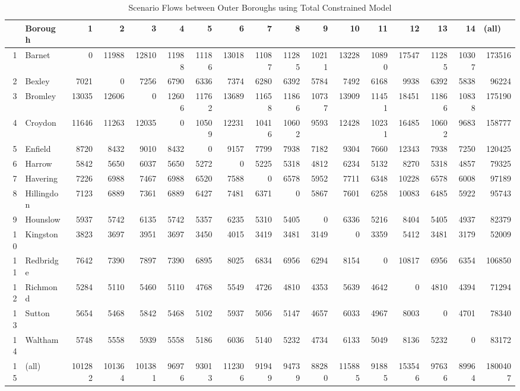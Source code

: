 \documentclass[11pt]{article} %
\begin{document}

\begin{table}
\footnotesize
\caption{Scenario Flows between Outer Boroughs using Total Constrained Model}
\begin{tabular}{|r|l|r|r|r|r|r|r|r|r|r|r|r|r|r|r|r|}
\hline
\multicolumn{1}{|l|}{} & Borough & 1 & 2 & 3 & 4 & 5 & 6 & 7 & 8 & 9 & 10 & 11 & 12 & 13 & 14 & \multicolumn{1}{l|}{(all)} \\ \hline
1 & Barnet & 0 & 11988 & 12810 & 11988 & 11186 & 13018 & 11087 & 11285 & 10211 & 13228 & 10890 & 17547 & 11285 & 10307 & 173516 \\ \hline
2 & Bexley & 7021 & 0 & 7256 & 6790 & 6336 & 7374 & 6280 & 6392 & 5784 & 7492 & 6168 & 9938 & 6392 & 5838 & 96224 \\ \hline
3 & Bromley & 13035 & 12606 & 0 & 12606 & 11762 & 13689 & 11658 & 11866 & 10737 & 13909 & 11451 & 18451 & 11866 & 10838 & 175190 \\ \hline
4 & Croydon & 11646 & 11263 & 12035 & 0 & 10509 & 12231 & 10416 & 10602 & 9593 & 12428 & 10231 & 16485 & 10602 & 9683 & 158777 \\ \hline
5 & Enfield & 8720 & 8432 & 9010 & 8432 & 0 & 9157 & 7799 & 7938 & 7182 & 9304 & 7660 & 12343 & 7938 & 7250 & 120425 \\ \hline
6 & Harrow & 5842 & 5650 & 6037 & 5650 & 5272 & 0 & 5225 & 5318 & 4812 & 6234 & 5132 & 8270 & 5318 & 4857 & 79325 \\ \hline
7 & Havering & 7226 & 6988 & 7467 & 6988 & 6520 & 7588 & 0 & 6578 & 5952 & 7711 & 6348 & 10228 & 6578 & 6008 & 97189 \\ \hline
8 & Hillingdon & 7123 & 6889 & 7361 & 6889 & 6427 & 7481 & 6371 & 0 & 5867 & 7601 & 6258 & 10083 & 6485 & 5922 & 95743 \\ \hline
9 & Hounslow & 5937 & 5742 & 6135 & 5742 & 5357 & 6235 & 5310 & 5405 & 0 & 6336 & 5216 & 8404 & 5405 & 4937 & 82379 \\ \hline
10 & Kingston & 3823 & 3697 & 3951 & 3697 & 3450 & 4015 & 3419 & 3481 & 3149 & 0 & 3359 & 5412 & 3481 & 3179 & 52009 \\ \hline
11 & Redbridge & 7642 & 7390 & 7897 & 7390 & 6895 & 8025 & 6834 & 6956 & 6294 & 8154 & 0 & 10817 & 6956 & 6354 & 106850 \\ \hline
12 & Richmond & 5284 & 5110 & 5460 & 5110 & 4768 & 5549 & 4726 & 4810 & 4353 & 5639 & 4642 & 0 & 4810 & 4394 & 71294 \\ \hline
13 & Sutton & 5654 & 5468 & 5842 & 5468 & 5102 & 5937 & 5056 & 5147 & 4657 & 6033 & 4967 & 8003 & 0 & 4701 & 78340 \\ \hline
14 & Waltham & 5748 & 5558 & 5939 & 5558 & 5186 & 6036 & 5140 & 5232 & 4734 & 6133 & 5049 & 8136 & 5232 & 0 & 83172 \\ \hline
15 & (all) & 101282 & 101364 & 101381 & 96976 & 93013 & 112306 & 91949 & 94739 & 88280 & 115885 & 91885 & 153546 & 97636 & 89964 & 1800407 \\ \hline
\end{tabular}
\label{Estimated Flows}
\end{table}
\end{document}
